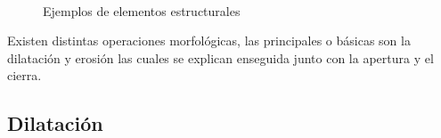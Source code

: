 \begin{figure}
\centering
{} %
\qquad
{} 
\\
\caption{Ejemplos de elementos estructurales} \label{fig:EX}
\end{figure} 

Existen distintas operaciones morfológicas, las principales o básicas son la dilatación y erosión las cuales se explican enseguida junto con la apertura y el cierra. 
 
\subsection{Dilatación}\label{Dilatation}


